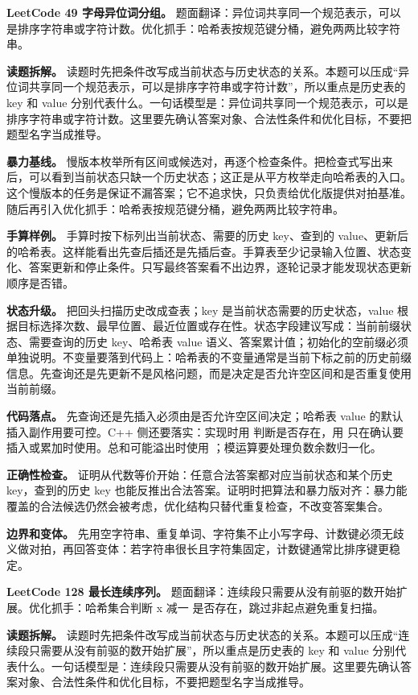 \noindent\textbf{LeetCode 49 字母异位词分组。} 题面翻译：异位词共享同一个规范表示，可以是排序字符串或字符计数。优化抓手：哈希表按规范键分桶，避免两两比较字符串。

\textbf{读题拆解。} 读题时先把条件改写成当前状态与历史状态的关系。本题可以压成“异位词共享同一个规范表示，可以是排序字符串或字符计数”，所以重点是历史表的 key 和 value 分别代表什么。一句话模型是：异位词共享同一个规范表示，可以是排序字符串或字符计数。这里要先确认答案对象、合法性条件和优化目标，不要把题型名字当成推导。

\textbf{暴力基线。} 慢版本枚举所有区间或候选对，再逐个检查条件。把检查式写出来后，可以看到当前状态只缺一个历史状态；这正是从平方枚举走向哈希表的入口。这个慢版本的任务是保证不漏答案；它不追求快，只负责给优化版提供对拍基准。随后再引入优化抓手：哈希表按规范键分桶，避免两两比较字符串。

\textbf{手算样例。} 手算时按下标列出当前状态、需要的历史 key、查到的 value、更新后的哈希表。这样能看出先查后插还是先插后查。手算表至少记录输入位置、状态变化、答案更新和停止条件。只写最终答案看不出边界，逐轮记录才能发现状态更新顺序是否错。

\textbf{状态升级。} 把回头扫描历史改成查表；key 是当前状态需要的历史状态，value 根据目标选择次数、最早位置、最近位置或存在性。状态字段建议写成：当前前缀状态、需要查询的历史 key、哈希表 value 语义、答案累计值；初始化的空前缀必须单独说明。不变量要落到代码上：哈希表的不变量通常是当前下标之前的历史前缀信息。先查询还是先更新不是风格问题，而是决定是否允许空区间和是否重复使用当前前缀。

\textbf{代码落点。} 先查询还是先插入必须由是否允许空区间决定；哈希表 value 的默认插入副作用要可控。C++ 侧还要落实：实现时用  判断是否存在，用  只在确认要插入或累加时使用。总和可能溢出时使用 ；模运算要处理负数余数归一化。

\textbf{正确性检查。} 证明从代数等价开始：任意合法答案都对应当前状态和某个历史 key，查到的历史 key 也能反推出合法答案。证明时把算法和暴力版对齐：暴力能覆盖的合法候选仍然会被考虑，优化结构只替代重复检查，不改变答案集合。

\textbf{边界和变体。} 先用空字符串、重复单词、字符集不止小写字母、计数键必须无歧义做对拍，再回答变体：若字符串很长且字符集固定，计数键通常比排序键更稳定。

\noindent\textbf{LeetCode 128 最长连续序列。} 题面翻译：连续段只需要从没有前驱的数开始扩展。优化抓手：哈希集合判断 x 减一 是否存在，跳过非起点避免重复扫描。

\textbf{读题拆解。} 读题时先把条件改写成当前状态与历史状态的关系。本题可以压成“连续段只需要从没有前驱的数开始扩展”，所以重点是历史表的 key 和 value 分别代表什么。一句话模型是：连续段只需要从没有前驱的数开始扩展。这里要先确认答案对象、合法性条件和优化目标，不要把题型名字当成推导。

